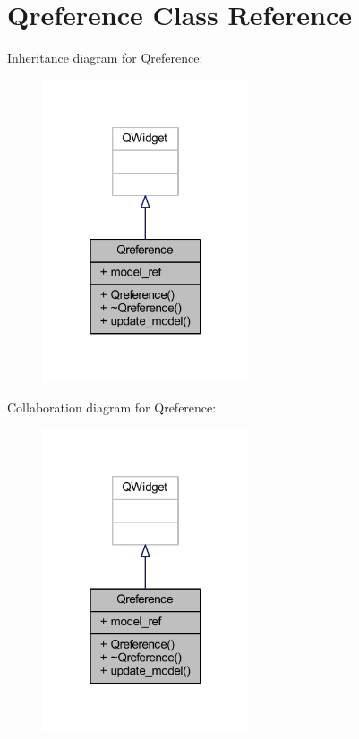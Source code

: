 \hypertarget{class_qreference}{}\section{Qreference Class Reference}
\label{class_qreference}


Inheritance diagram for Qreference\+:\nopagebreak
\begin{figure}[H]
\begin{center}
\leavevmode
\includegraphics[width=172pt]{class_qreference__inherit__graph}
\end{center}
\end{figure}


Collaboration diagram for Qreference\+:\nopagebreak
\begin{figure}[H]
\begin{center}
\leavevmode
\includegraphics[width=172pt]{class_qreference__coll__graph}
\end{center}
\end{figure}
